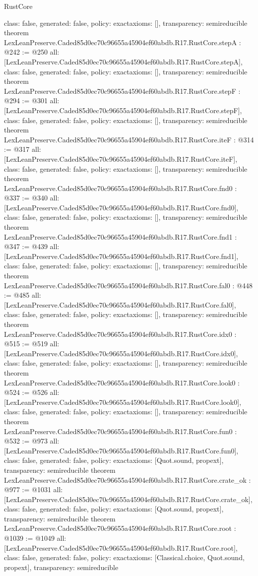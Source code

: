 \begin{lexlean}{RustCore}
\begin{coremodule}
{  class: false,
  generated: false,
  policy: exact{axioms: []},
  transparency: semireducible
}
theorem LexLeanPreserve.Caded85d0ec70c96655a45904ef60abdb.R17.RustCore.stepA : @242 := @250 {
  all: [LexLeanPreserve.Caded85d0ec70c96655a45904ef60abdb.R17.RustCore.stepA],
  class: false,
  generated: false,
  policy: exact{axioms: []},
  transparency: semireducible
}
theorem LexLeanPreserve.Caded85d0ec70c96655a45904ef60abdb.R17.RustCore.stepF : @294 := @301 {
  all: [LexLeanPreserve.Caded85d0ec70c96655a45904ef60abdb.R17.RustCore.stepF],
  class: false,
  generated: false,
  policy: exact{axioms: []},
  transparency: semireducible
}
theorem LexLeanPreserve.Caded85d0ec70c96655a45904ef60abdb.R17.RustCore.iteF : @314 := @317 {
  all: [LexLeanPreserve.Caded85d0ec70c96655a45904ef60abdb.R17.RustCore.iteF],
  class: false,
  generated: false,
  policy: exact{axioms: []},
  transparency: semireducible
}
theorem LexLeanPreserve.Caded85d0ec70c96655a45904ef60abdb.R17.RustCore.fnd0 : @337 := @340 {
  all: [LexLeanPreserve.Caded85d0ec70c96655a45904ef60abdb.R17.RustCore.fnd0],
  class: false,
  generated: false,
  policy: exact{axioms: []},
  transparency: semireducible
}
theorem LexLeanPreserve.Caded85d0ec70c96655a45904ef60abdb.R17.RustCore.fnd1 : @347 := @439 {
  all: [LexLeanPreserve.Caded85d0ec70c96655a45904ef60abdb.R17.RustCore.fnd1],
  class: false,
  generated: false,
  policy: exact{axioms: []},
  transparency: semireducible
}
theorem LexLeanPreserve.Caded85d0ec70c96655a45904ef60abdb.R17.RustCore.fal0 : @448 := @485 {
  all: [LexLeanPreserve.Caded85d0ec70c96655a45904ef60abdb.R17.RustCore.fal0],
  class: false,
  generated: false,
  policy: exact{axioms: []},
  transparency: semireducible
}
theorem LexLeanPreserve.Caded85d0ec70c96655a45904ef60abdb.R17.RustCore.idx0 : @515 := @519 {
  all: [LexLeanPreserve.Caded85d0ec70c96655a45904ef60abdb.R17.RustCore.idx0],
  class: false,
  generated: false,
  policy: exact{axioms: []},
  transparency: semireducible
}
theorem LexLeanPreserve.Caded85d0ec70c96655a45904ef60abdb.R17.RustCore.look0 : @524 := @526 {
  all: [LexLeanPreserve.Caded85d0ec70c96655a45904ef60abdb.R17.RustCore.look0],
  class: false,
  generated: false,
  policy: exact{axioms: []},
  transparency: semireducible
}
theorem LexLeanPreserve.Caded85d0ec70c96655a45904ef60abdb.R17.RustCore.fun0 : @532 := @973 {
  all: [LexLeanPreserve.Caded85d0ec70c96655a45904ef60abdb.R17.RustCore.fun0],
  class: false,
  generated: false,
  policy: exact{axioms: [Quot.sound, propext]},
  transparency: semireducible
}
theorem LexLeanPreserve.Caded85d0ec70c96655a45904ef60abdb.R17.RustCore.crate_ok : @977 := @1031 {
  all: [LexLeanPreserve.Caded85d0ec70c96655a45904ef60abdb.R17.RustCore.crate_ok],
  class: false,
  generated: false,
  policy: exact{axioms: [Quot.sound, propext]},
  transparency: semireducible
}
theorem LexLeanPreserve.Caded85d0ec70c96655a45904ef60abdb.R17.RustCore.root : @1039 := @1049 {
  all: [LexLeanPreserve.Caded85d0ec70c96655a45904ef60abdb.R17.RustCore.root],
  class: false,
  generated: false,
  policy: exact{axioms: [Classical.choice, Quot.sound, propext]},
  transparency: semireducible
}


\end{coremodule}
\end{lexlean}

